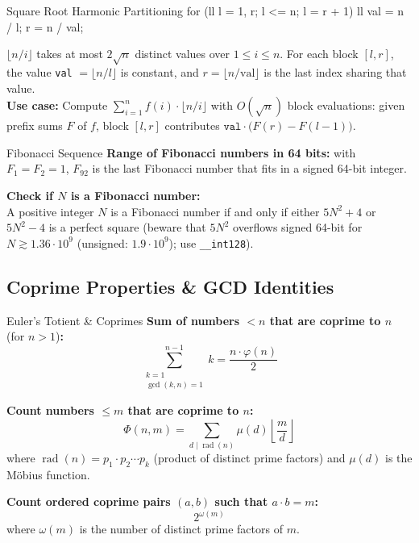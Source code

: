 \documentclass[10pt]{article}
\newcommand{\complexity}[1]{%
  \tcbox[on line,
    colback=tagbg,
    colframe=tagbg,
    boxrule=0pt,
    arc=2pt,
    boxsep=0pt,
    left=3.5pt, right=3.5pt, top=1.5pt, bottom=1.5pt
  ]{\color{tagtext}\scriptsize\bfseries\ensuremath{#1}}%
}
\DeclareMathOperator{\rad}{rad}
\begin{document}
\begin{vscode}{Square Root Harmonic Partitioning \complexity{O(\sqrt{N})}}
for (ll l = 1, r; l <= n; l = r + 1) 
{
    ll val = n / l;
    r = n / val;
}
\end{vscode}
\begin{derivation}
    $\lfloor n / i \rfloor$ takes at most $2\sqrt{n}$ distinct values over $1 \le i \le n$. For each block $[l, r]$, the value \texttt{val} $= \lfloor n / l \rfloor$ is constant, and $r = \lfloor n / \text{val} \rfloor$ is the last index sharing that value. \\
    \textbf{Use case:} Compute $\sum_{i=1}^n f(i) \cdot \lfloor n / i \rfloor$ with $O(\sqrt{n})$ block evaluations: given prefix sums $F$ of $f$, block $[l, r]$ contributes $\texttt{val} \cdot \big(F(r) - F(l-1)\big)$.
\end{derivation}

\begin{conceptbox}{Fibonacci Sequence}
    \textbf{Range of Fibonacci numbers in 64 bits:} with $F_1 = F_2 = 1$, $F_{92}$ is the last Fibonacci number that fits in a signed 64-bit integer.
    
    \textbf{Check if $N$ is a Fibonacci number:} \\
    A positive integer $N$ is a Fibonacci number if and only if either $5N^2 + 4$ or $5N^2 - 4$ is a perfect square (beware that $5N^2$ overflows signed 64-bit for $N \gtrsim 1.36 \cdot 10^9$ (unsigned: $1.9 \cdot 10^9$); use \texttt{\_\_int128}).
\end{conceptbox}

\subsection{Coprime Properties \& GCD Identities}

\begin{conceptbox}{Euler's Totient \& Coprimes}
    \textbf{Sum of numbers $< n$ that are coprime to $n$} (for $n > 1$)\textbf{:}
    \[ \sum_{\substack{k = 1 \\ \gcd(k, n) = 1}}^{n - 1} k = \frac{n \cdot \varphi(n)}{2} \]

    \textbf{Count numbers $\le m$ that are coprime to $n$:}
    \[ \Phi(n, m) = \sum_{d \mid \rad(n)} \mu(d) \left\lfloor \frac{m}{d} \right\rfloor \]
    where $\rad(n) = p_1 \cdot p_2 \cdots p_k$ (product of distinct prime factors) and $\mu(d)$ is the Möbius function.

    \textbf{Count ordered coprime pairs $(a, b)$ such that $a \cdot b = m$:}
    \[ 2^{\omega(m)} \]
    where $\omega(m)$ is the number of distinct prime factors of $m$.
\end{conceptbox}
\end{document}
